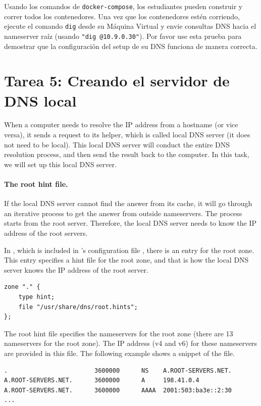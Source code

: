 Usando los comandos de \texttt{docker-compose}, los estudiantes pueden construir y correr todos los contenedores.
Una vez que los contenedores estén corriendo, ejecute el comando \texttt{dig} desde su Máquina Virtual y envie consultas DNS hacia el nameserver raíz (usando \texttt{"dig @10.9.0.30"}). Por favor use esta prueba para demostrar que la configuración del setup de su DNS funciona de manera correcta.


\section{Tarea 5: Creando el servidor de DNS local} 

When a computer needs to resolve the IP address from a hostname (or vice versa),
it sends a request to its helper, which is called local DNS server (it
does not need to be local).  This local DNS server will conduct the 
entire DNS resolution process, and then send the result back to the computer. 
In this task, we will set up this local DNS server. 


\paragraph{The root hint file.}
If the local DNS server cannot find the answer from its cache, it 
will go through an iterative process to get the answer from outside 
nameservers.  The process starts from the root server. 
Therefore, the local DNS server needs to
know the IP address of the root servers. 


In , which is included 
in \bind's configuration file , there is an 
entry for the root zone. This entry specifies a hint file for the
root zone, and that is how the local DNS server knows the IP address of the
root server. 


\begin{lstlisting}
zone "." {
	type hint;
	file "/usr/share/dns/root.hints";
};
\end{lstlisting}
 
The root hint file specifies the nameservers for the 
root zone (there are 13 nameservers for the root zone). The 
IP address (v4 and v6) for these nameservers are provided in this file. 
The following example shows a snippet of the file. 


\begin{lstlisting}
.                        3600000      NS    A.ROOT-SERVERS.NET.
A.ROOT-SERVERS.NET.      3600000      A     198.41.0.4
A.ROOT-SERVERS.NET.      3600000      AAAA  2001:503:ba3e::2:30
...
\end{lstlisting}

